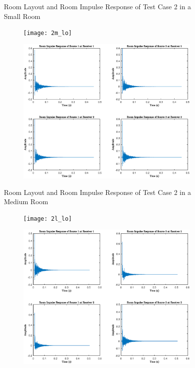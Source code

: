 \documentclass[a4paper,twoside,12pt,hidelinks]{article}
\begin{document}
\begin{appendices}
\begin{figure}[H]
\begin{subfigure}[H]{0.55\textwidth}
\end{subfigure}
\caption{Room Layout and Room Impulse Response of Test Case 2 in a Small Room}
\end{figure}
\begin{figure}[H]
\centering
\begin{subfigure}[H]{0.44\textwidth}
\texttt{[image: 2m\_lo]}
\end{subfigure}
\begin{subfigure}[H]{0.55\textwidth}
\includegraphics[width=\textwidth]{2m_ir}
\end{subfigure}
\caption{Room Layout and Room Impulse Response of Test Case 2 in a Medium Room}
\end{figure}
\begin{figure}[H]
\centering
\begin{subfigure}[H]{0.44\textwidth}
\texttt{[image: 2l\_lo]}
\end{subfigure}
\begin{subfigure}[H]{0.55\textwidth}
\includegraphics[width=\textwidth]{2l_ir}

\end{subfigure}
\end{figure}
\end{appendices}
\end{document}
